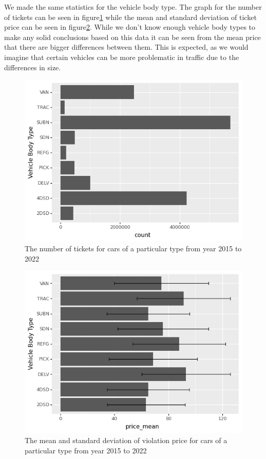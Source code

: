 \documentclass[12pt]{fphw}
\begin{document}
We made the same statistics for the vehicle body type. The graph for the number of tickets can be seen in figure\ref{fig:type_1} while the mean and standard deviation of ticket price can be seen in figure\ref{fig:type_2}.
While we don't know enough vehicle body types to make any solid conclusions based on this data it can be seen from the mean price that there are bigger differences between them. This is expected, as we would imagine that certain vehicles can be more problematic in traffic due to the differences in size.

\begin{figure}[h!]
  \label{fig:type_1}
  \includegraphics[width=1\textwidth]{figures2/VehicleBT_count.png}
  \caption{The number of tickets for cars of a particular type from year 2015 to 2022}
\end{figure}

\begin{figure}[h!]
  \label{fig:type_2}
  \includegraphics[width=1\textwidth]{figures2/VehicleBT_price.png}
  \caption{The mean and standard deviation of violation price for cars of a particular type from year 2015 to 2022}
\end{figure}
\end{document}
